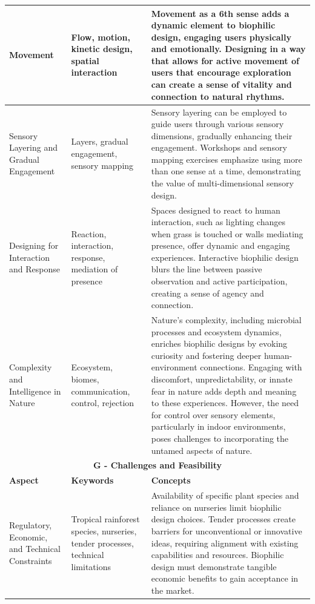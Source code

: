 \begin{longtable}{|p{3cm}|p{3.5cm}|p{7.5cm}|}
Movement & Flow, motion, kinetic design, spatial interaction & Movement as a 6th sense adds a dynamic element to biophilic design, engaging users physically and emotionally. Designing in a way that allows for active movement  of users  that encourage exploration can create a sense of vitality and connection to natural rhythms. \\ \hline

Sensory Layering and Gradual Engagement & Layers, gradual engagement, sensory mapping & Sensory layering can be employed to guide users through various sensory dimensions, gradually enhancing their engagement. Workshops and sensory mapping exercises emphasize using more than one sense at a time, demonstrating the value of multi-dimensional sensory design. \\ \hline

Designing for Interaction and Response & Reaction, interaction, response, mediation of presence & Spaces designed to react to human interaction, such as lighting changes when grass is touched or walls mediating presence, offer dynamic and engaging experiences. Interactive biophilic design blurs the line between passive observation and active participation, creating a sense of agency and connection. \\ \hline

Complexity and Intelligence in Nature & Ecosystem, biomes, communication, control, rejection & Nature’s complexity, including microbial processes and ecosystem dynamics, enriches biophilic designs by evoking curiosity and fostering deeper human-environment connections. Engaging with discomfort, unpredictability, or innate fear in nature adds depth and meaning to these experiences. However, the need for control over sensory elements, particularly in indoor environments, poses challenges to incorporating the untamed aspects of nature. \\ \hline

\multicolumn{3}{|c|}{\cellcolor[HTML]{E3F2FD}\textbf{G - Challenges and Feasibility}} \\ \hline
\textbf{Aspect} & \textbf{Keywords} & \textbf{Concepts} \\
\hline
Regulatory, Economic, and Technical Constraints & Tropical rainforest species, nurseries, tender processes, technical limitations & Availability of specific plant species and reliance on nurseries limit biophilic design choices. Tender processes create barriers for unconventional or innovative ideas, requiring alignment with existing capabilities and resources. Biophilic design must demonstrate tangible economic benefits to gain acceptance in the market. \\ \hline



\end{longtable}
